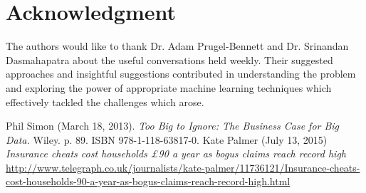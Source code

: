 \documentclass[conference, onecolumn]{IEEEtran}
\begin{document}


\section*{Acknowledgment}

The authors would like to thank Dr. Adam Prugel-Bennett and Dr. Srinandan Dasmahapatra about the useful conversations held weekly. Their suggested approaches and insightful suggestions contributed in understanding the problem and exploring the power of appropriate machine learning techniques which effectively tackled the challenges which arose.


\begin{thebibliography}{99}
 Phil Simon (March 18, 2013). \emph{Too Big to Ignore: The Business Case for Big Data.} Wiley. p. 89. ISBN 978-1-118-63817-0.
 Kate Palmer (July 13, 2015)  \emph{Insurance cheats cost households £90 a year as bogus claims reach record high}\\
\url{http://www.telegraph.co.uk/journalists/kate-palmer/11736121/Insurance-cheats-cost-households-90-a-year-as-bogus-claims-reach-record-high.html}


\end{thebibliography}
\end{document}
